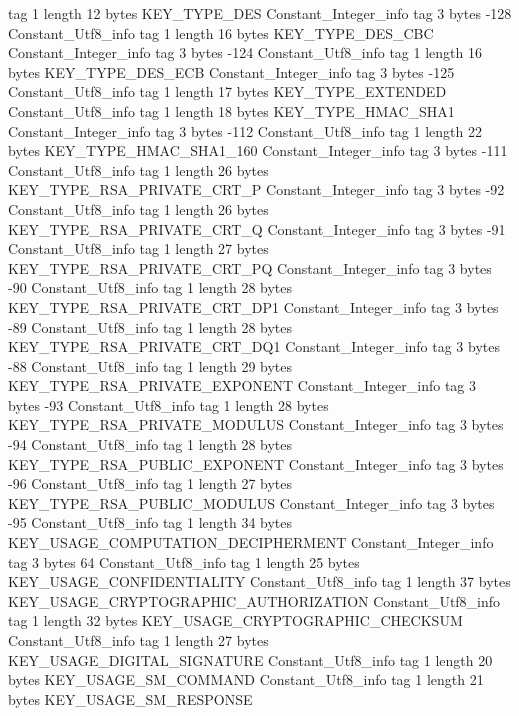 {{{			tag	1
			length	12
			bytes	KEY_TYPE_DES
		}
		Constant_Integer_info {
			tag	3
			bytes	-128
		}
		Constant_Utf8_info {
			tag	1
			length	16
			bytes	KEY_TYPE_DES_CBC
		}
		Constant_Integer_info {
			tag	3
			bytes	-124
		}
		Constant_Utf8_info {
			tag	1
			length	16
			bytes	KEY_TYPE_DES_ECB
		}
		Constant_Integer_info {
			tag	3
			bytes	-125
		}
		Constant_Utf8_info {
			tag	1
			length	17
			bytes	KEY_TYPE_EXTENDED
		}
		Constant_Utf8_info {
			tag	1
			length	18
			bytes	KEY_TYPE_HMAC_SHA1
		}
		Constant_Integer_info {
			tag	3
			bytes	-112
		}
		Constant_Utf8_info {
			tag	1
			length	22
			bytes	KEY_TYPE_HMAC_SHA1_160
		}
		Constant_Integer_info {
			tag	3
			bytes	-111
		}
		Constant_Utf8_info {
			tag	1
			length	26
			bytes	KEY_TYPE_RSA_PRIVATE_CRT_P
		}
		Constant_Integer_info {
			tag	3
			bytes	-92
		}
		Constant_Utf8_info {
			tag	1
			length	26
			bytes	KEY_TYPE_RSA_PRIVATE_CRT_Q
		}
		Constant_Integer_info {
			tag	3
			bytes	-91
		}
		Constant_Utf8_info {
			tag	1
			length	27
			bytes	KEY_TYPE_RSA_PRIVATE_CRT_PQ
		}
		Constant_Integer_info {
			tag	3
			bytes	-90
		}
		Constant_Utf8_info {
			tag	1
			length	28
			bytes	KEY_TYPE_RSA_PRIVATE_CRT_DP1
		}
		Constant_Integer_info {
			tag	3
			bytes	-89
		}
		Constant_Utf8_info {
			tag	1
			length	28
			bytes	KEY_TYPE_RSA_PRIVATE_CRT_DQ1
		}
		Constant_Integer_info {
			tag	3
			bytes	-88
		}
		Constant_Utf8_info {
			tag	1
			length	29
			bytes	KEY_TYPE_RSA_PRIVATE_EXPONENT
		}
		Constant_Integer_info {
			tag	3
			bytes	-93
		}
		Constant_Utf8_info {
			tag	1
			length	28
			bytes	KEY_TYPE_RSA_PRIVATE_MODULUS
		}
		Constant_Integer_info {
			tag	3
			bytes	-94
		}
		Constant_Utf8_info {
			tag	1
			length	28
			bytes	KEY_TYPE_RSA_PUBLIC_EXPONENT
		}
		Constant_Integer_info {
			tag	3
			bytes	-96
		}
		Constant_Utf8_info {
			tag	1
			length	27
			bytes	KEY_TYPE_RSA_PUBLIC_MODULUS
		}
		Constant_Integer_info {
			tag	3
			bytes	-95
		}
		Constant_Utf8_info {
			tag	1
			length	34
			bytes	KEY_USAGE_COMPUTATION_DECIPHERMENT
		}
		Constant_Integer_info {
			tag	3
			bytes	64
		}
		Constant_Utf8_info {
			tag	1
			length	25
			bytes	KEY_USAGE_CONFIDENTIALITY
		}
		Constant_Utf8_info {
			tag	1
			length	37
			bytes	KEY_USAGE_CRYPTOGRAPHIC_AUTHORIZATION
		}
		Constant_Utf8_info {
			tag	1
			length	32
			bytes	KEY_USAGE_CRYPTOGRAPHIC_CHECKSUM
		}
		Constant_Utf8_info {
			tag	1
			length	27
			bytes	KEY_USAGE_DIGITAL_SIGNATURE
		}
		Constant_Utf8_info {
			tag	1
			length	20
			bytes	KEY_USAGE_SM_COMMAND
		}
		Constant_Utf8_info {
			tag	1
			length	21
			bytes	KEY_USAGE_SM_RESPONSE
		}
}}
